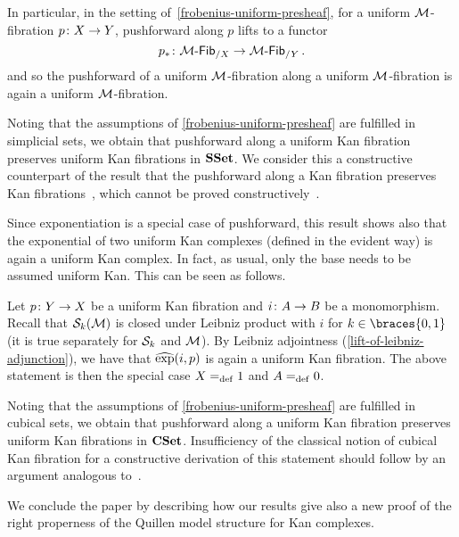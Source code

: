 \documentclass[reqno,10pt,a4paper,oneside,draft]{amsart}
\begin{document}
In particular, in the setting of~\cref{frobenius-uniform-presheaf}, for  a uniform $\cal{M}$-fibration $p \co X \to Y$, pushforward along $p$ lifts to a functor 
\[
p_* \co \Fib{\cal{M}}_{/X} \to \Fib{\cal{M}}_{/Y} \, .
\]
and so the pushforward of a uniform $\cal{M}$-fibration along a uniform $\cal{M}$-fibration is again a uniform $\cal{M}$-fibration.


\begin{example}
Noting that the assumptions of \cref{frobenius-uniform-presheaf} are fulfilled in simplicial sets, we obtain that pushforward along a uniform Kan fibration preserves uniform Kan fibrations in $\SSet$.
We consider this a constructive counterpart of the result that the pushforward along a Kan fibration preserves Kan fibrations~\cite{voevodsky-simplicial-model}, which cannot be proved constructively~\cite{coquand-non-constructivity-kan}.

Since exponentiation is a special case of pushforward, this result shows also that the exponential of two uniform Kan complexes (defined in the evident way) is again a uniform Kan complex.
In fact, as usual, only the base needs to be assumed uniform Kan.
This can be seen as follows.

Let $p \co Y \to X$ be a uniform Kan fibration and $i \co A \to B$ be a  monomorphism.
Recall that $\cal{S}_k(\cal{M})$ is closed under Leibniz product with $i$ for $k \in \braces{0, 1}$ (it is true separately for $\cal{S}_k$ and $\cal{M}$).
By Leibniz adjointness (\cref{lift-of-leibniz-adjunction}), we have that $\hatexp(i, p)$ is again a uniform Kan fibration.
The above statement is then the special case $X \defeq 1$ and $A \defeq 0$.
\end{example}

\begin{example}
Noting that the assumptions of \cref{frobenius-uniform-presheaf} are fulfilled in cubical sets, we obtain that pushforward along a uniform Kan fibration preserves uniform Kan fibrations in $\CSet$.
Insufficiency of the classical notion of cubical Kan fibration for a constructive derivation of this statement should follow by an argument analogous to~\cite{coquand-non-constructivity-kan}.
\end{example}

We conclude the paper by describing how our results give also a new proof of the
right properness of the Quillen model structure for Kan complexes. 
\end{document}

